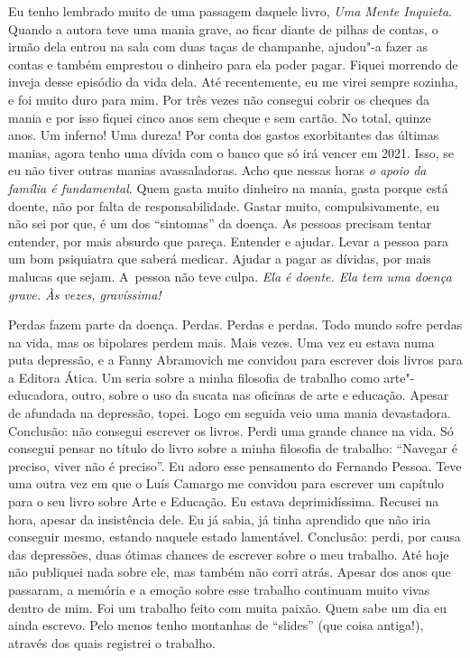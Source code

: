 Eu tenho lembrado muito de uma passagem daquele livro, \emph{Uma Mente
Inquieta}. Quando a autora teve uma mania grave, ao ficar diante de
pilhas de contas, o irmão dela entrou na sala com duas taças de
champanhe, ajudou"-a fazer as contas e também emprestou o dinheiro para
ela poder pagar. Fiquei morrendo de inveja desse episódio da vida dela.
Até recentemente, eu me virei sempre sozinha, e foi muito duro para mim.
Por três vezes não consegui cobrir os cheques da mania e por isso fiquei
cinco anos sem cheque e sem cartão. No total, quinze anos. Um inferno!
Uma dureza! Por conta dos gastos exorbitantes das últimas manias, agora
tenho uma dívida com o banco que só irá vencer em 2021. Isso, se eu não
tiver outras manias avassaladoras. Acho que nessas horas \emph{o apoio
da família é fundamental}. Quem gasta muito dinheiro na mania, gasta
porque está doente, não por falta de responsabilidade. Gastar muito,
compulsivamente, eu não sei por que, é um dos ``sintomas'' da doença. As
pessoas precisam tentar entender, por mais absurdo que pareça. Entender
e ajudar. Levar a pessoa para um bom psiquiatra que saberá medicar.
Ajudar a pagar as dívidas, por mais malucas que sejam. A~pessoa não teve
culpa. \emph{Ela é doente. Ela tem uma doença grave. Às vezes,
gravíssima!}

Perdas fazem parte da doença. Perdas. Perdas e perdas. Todo mundo sofre
perdas na vida, mas os bipolares perdem mais. Mais vezes. Uma vez eu
estava numa puta depressão, e a Fanny Abramovich me convidou para
escrever dois livros para a Editora Ática. Um seria sobre a minha
filosofia de trabalho como arte"-educadora, outro, sobre o uso da sucata
nas oficinas de arte e educação. Apesar de afundada na depressão, topei.
Logo em seguida veio uma mania devastadora. Conclusão: não consegui
escrever os livros. Perdi uma grande chance na vida. Só consegui pensar
no título do livro sobre a minha filosofia de trabalho: ``Navegar é
preciso, viver não é preciso''. Eu adoro esse pensamento do Fernando
Pessoa. Teve uma outra vez em que o Luís Camargo me convidou para
escrever um capítulo para o seu livro sobre Arte e Educação. Eu estava
deprimidíssima. Recusei na hora, apesar da insistência dele. Eu já
sabia, já tinha aprendido que não iria conseguir mesmo, estando naquele
estado lamentável. Conclusão: perdi, por causa das depressões, duas
ótimas chances de escrever sobre o meu trabalho. Até hoje não publiquei
nada sobre ele, mas também não corri atrás. Apesar dos anos que
passaram, a memória e a emoção sobre esse trabalho continuam muito vivas
dentro de mim. Foi um trabalho feito com muita paixão. Quem sabe um dia
eu ainda escrevo. Pelo menos tenho montanhas de ``slides'' (que coisa
antiga!), através dos quais registrei o trabalho.

